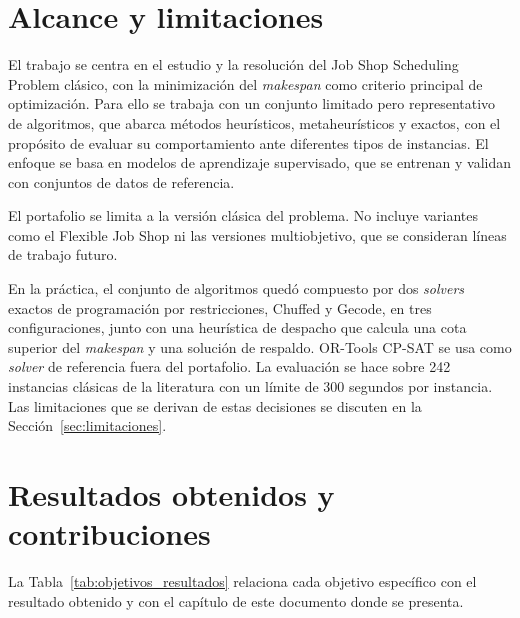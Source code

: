 \section{Alcance y limitaciones}
\label{sec:alcance}

El trabajo se centra en el estudio y la resolución del Job Shop Scheduling
Problem clásico, con la minimización del \textit{makespan} como criterio
principal de optimización. Para ello se trabaja con un conjunto limitado pero
representativo de algoritmos, que abarca métodos heurísticos, metaheurísticos y
exactos, con el propósito de evaluar su comportamiento ante diferentes tipos de
instancias. El enfoque se basa en modelos de aprendizaje supervisado, que se
entrenan y validan con conjuntos de datos de referencia.

El portafolio se limita a la versión clásica del problema. No incluye variantes
como el Flexible Job Shop ni las versiones multiobjetivo, que se consideran
líneas de trabajo futuro.

En la práctica, el conjunto de algoritmos quedó compuesto por dos
\textit{solvers} exactos de programación por restricciones, Chuffed y Gecode,
en tres configuraciones, junto con una heurística de despacho que calcula una
cota superior del \textit{makespan} y una solución de respaldo. OR-Tools CP-SAT
se usa como \textit{solver} de referencia fuera del portafolio. La evaluación se
hace sobre 242 instancias clásicas de la literatura con un límite de 300
segundos por instancia. Las limitaciones que se derivan de estas decisiones se
discuten en la Sección~\ref{sec:limitaciones}.

\section{Resultados obtenidos y contribuciones}
\label{sec:resultados_contribuciones}

La Tabla~\ref{tab:objetivos_resultados} relaciona cada objetivo específico con
el resultado obtenido y con el capítulo de este documento donde se presenta.

